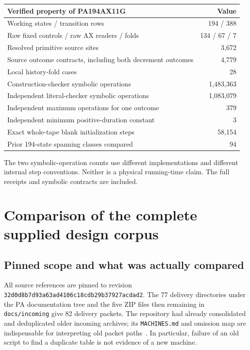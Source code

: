 \documentclass[11pt,letterpaper]{article}
\newcommand{\file}[1]{\texttt{\nolinkurl{#1}}}
\begin{document}
\begin{center}
\begin{tabular}{@{}lr@{}}
\toprule Verified property of PA194AX11G & Value\\\midrule
Working states / transition rows & 194 / 388\\
Raw fixed controls / raw AX readers / folds & 134 / 67 / 7\\
Resolved primitive source sites & 3,672\\
Source outcome contracts, including both decrement outcomes & 4,779\\
Local history-fold cases & 28\\
Construction-checker symbolic operations & 1,483,363\\
Independent literal-checker symbolic operations & 1,083,079\\
Independent maximum operations for one outcome & 379\\
Independent minimum positive-duration constant & 3\\
Exact whole-tape blank initialization steps & 58,154\\
Prior 194-state spanning classes compared & 94\\
\bottomrule
\end{tabular}
\end{center}
The two symbolic-operation counts use different implementations and
different internal step conventions. Neither is a physical running-time
claim. The full receipts and symbolic contracts are included.

\section{Comparison of the complete supplied design corpus}
\label{sec:comparison}

\subsection{Pinned scope and what was actually compared}

All source references are pinned to revision
\nolinkurl{32d0d8b7d93a63ad4106c18cdb29b37927acdad2}.
The 77 delivery directories under the PA documentation tree and the five
ZIP files then remaining in \file{docs/incoming} give 82 delivery packets.
The repository had already consolidated and deduplicated older incoming
archives; its \file{MACHINES.md} and omission map are indispensable for
interpreting old packet paths~\cite{catalogue}. In particular, failure of
an old script to find a duplicate table is not evidence of a new machine.
\end{document}
